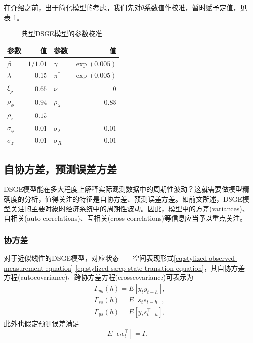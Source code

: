 在介绍之前，出于简化模型的考虑，我们先对$\theta$系数值作校准，暂时赋予定值，见表 \ref{tab:stylized-parameter-calibration}。

\begin{table}[htbp]
\begin{center}
    \centering
    \caption{典型DSGE模型的参数校准}
    \label{tab:stylized-parameter-calibration}
    \begin{tabular}{lr|lr}
        \hline
        参数 & 值 & 参数 & 值 \\
        \hline
        $\beta$ & $1/1.01 $ & $\gamma$ & $\exp \left( 0.005 \right)$ \\
        $\lambda$ & 0.15	&  $\pi^{*}$ & $\exp \left( 0.005 \right)$ \\
        $\xi_{p} $ &	$0.65$ & $\nu $ & $0$ \\
        $\rho_{\phi}$ & $0.94$ &	$\rho_{\lambda}$ &	$0.88$ \\
        $\rho_{z}$ & $0.13$ & & \\
        $\sigma_{\phi}$ &	$0.01$	& $\sigma_{\lambda}$ &	$0.01$\\
        $\sigma_{z}$	& $0.01$	& $\sigma_{R}$ &	$0.01$ \\
        \hline
    \end{tabular}
\end{center}
\end{table}

\subsection{自协方差，预测误差方差}
\label{sec:stylized-ssrep-var}
DSGE模型能在多大程度上解释实际观测数据中的周期性波动？这就需要做模型精确度的分析，值得关注的特征是自协方差、预测误差方差。如前文所述，DSGE模型关注的主要对象时经济系统中的周期性波动。因此，模型中的方差(variances)、自相关(auto correlations)、互相关(cross correlations)等信息应当予以重点关注。

\subsubsection{协方差}
\label{sec:stylized-ssrep-covariance-lyapunov}
对于近似线性的DSGE模型，对应状态——空间表现形式\eqref{eq:stylized-observed-measurement-equation} \eqref{eq:stylized-ssrep-state-transition-equation}，其自协方差方程(autocovariance)、跨协方差方程(crosscovariance)可表示为
\begin{equation}
  \label{eq:stylized-ssrep-autocov}
\begin{split}
    & \Gamma_{yy}\left( h \right) = E \left[ y_{t} y_{t-h} \right], \\
    & \Gamma_{ss} \left( h \right) = E \left[ s_{t} s_{t-h} \right], \\
    & \Gamma_{ys} \left( h \right) = E \left[ y_{t} s_{t-h}^{\top} \right],
\end{split}
\end{equation}
此外也假定预测误差满足
\begin{equation}
  \label{eq:stylized-ssrep-forecast-error-identity}
  E \left[ \epsilon_{t} \epsilon_{t}^{\top} \right] = I.
\end{equation}

